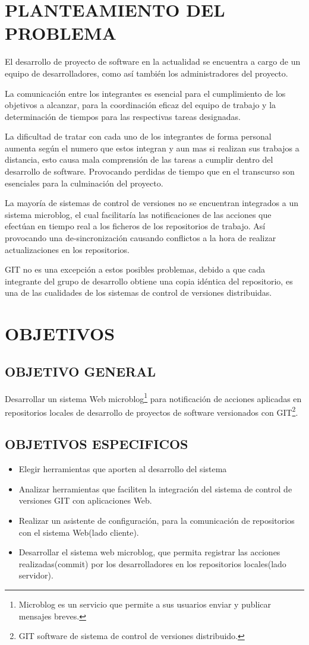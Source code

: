 \section{PLANTEAMIENTO DEL PROBLEMA}
El desarrollo de proyecto de software en la actualidad se encuentra a cargo de un equipo de desarrolladores, como así también los administradores del proyecto.

La comunicación entre los integrantes es esencial para el cumplimiento de los objetivos a alcanzar, para la coordinación eficaz del equipo de trabajo y la determinación de tiempos para las respectivas tareas designadas.

La dificultad de tratar con cada uno de los integrantes de forma personal aumenta según el numero que estos integran y aun mas si realizan sus trabajos a distancia, esto causa mala comprensión de las tareas a cumplir dentro del desarrollo de software. Provocando perdidas de tiempo que en el transcurso son esenciales para la culminación del proyecto.

La mayoría de sistemas de control de versiones no se encuentran integrados a un sistema microblog, el cual facilitaría las notificaciones de las acciones que efectúan en tiempo real a los ficheros de los repositorios de trabajo. Así provocando una de-sincronización causando conflictos a la hora de realizar actualizaciones en los repositorios.

GIT no es una excepción a estos posibles problemas, debido a que cada integrante del grupo de desarrollo obtiene una copia idéntica del repositorio, es una de las cualidades de los sistemas de control de versiones distribuidas.
\section{OBJETIVOS}
\subsection{OBJETIVO GENERAL}
Desarrollar un sistema Web microblog\footnote{Microblog es un servicio que permite a sus usuarios enviar y publicar mensajes breves.
} para notificación de acciones aplicadas en repositorios locales de desarrollo de proyectos de software versionados con GIT\footnote{GIT software de sistema de control de versiones distribuido.
}.

\subsection{OBJETIVOS ESPECIFICOS}
\begin{itemize}
\item Elegir herramientas que aporten al desarrollo del sistema
\item Analizar herramientas que faciliten la integración del sistema de control 	de versiones GIT con aplicaciones Web.
\item Realizar un asistente de configuración, para la comunicación de 	repositorios con el sistema Web(lado cliente).
\item Desarrollar el sistema web microblog, que permita registrar las acciones realizadas(commit) por los desarrolladores en los repositorios locales(lado servidor).
\end{itemize}

